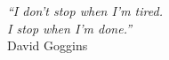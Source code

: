 \thispagestyle{plain}

\vspace*{8cm}

\begin{flushright}
   \textsl{``I don't stop when I'm tired.\\
             I stop when I'm done.''} \\
\vspace*{1.5cm}
           David Goggins
\end{flushright}

\cleardoublepage

